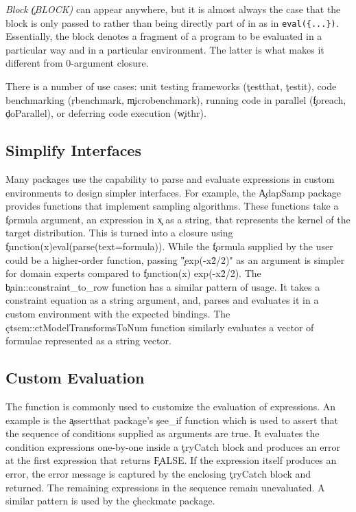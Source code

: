\documentclass[screen,acmsmall]{acmart}
\newcommand{\authorcomment}[3]{\xspace\textcolor{#1}{{\bf #2} #3}\xspace}
\newcommand{\todo}[1]{\authorcomment{red}{TODO}{#1}}
\begin{document}
\begin{compactitem}[---]
  \item \emph{Block \c{(BLOCK)}} can appear anywhere, but it is almost always
    the case that the block is only passed to \eval rather than being directly
    part of in as in \lstinline|eval({...})|. Essentially, the block denotes a
    fragment of a program to be evaluated in a particular way and in a particular
    environment. The latter is what makes it different from 0-argument closure.

    There is a number of use cases: unit testing frameworks (\eg \c{testthat},
    \c{testit}), code benchmarking (\eg \c{rbenchmark}, \c{microbenchmark}),
    running code in parallel (\eg \c{foreach}, \c{doParallel}), or deferring
    code execution (\eg \c{withr}).

\end{compactitem}


\subsection{Simplify Interfaces}
Many packages use the capability to parse and evaluate expressions in custom
environments to design simpler interfaces. For example, the \c{AdapSamp} package
provides functions that implement sampling algorithms. These functions take a
\c{formula} argument, an expression in \c{x} as a string, that represents the
kernel of the target distribution. This is turned into a closure using
\c{function(x){eval(parse(text=formula))}}. While the \c{formula} supplied by
the user could be a higher-order function, passing \c{"exp(-x\^2/2)"} as an
argument is simpler for domain experts compared to \c{function(x) exp(-x\^2/2)}.
The \c{bain::constraint\_to\_row} function has a similar pattern of \eval usage.
It takes a constraint equation as a string argument, and, parses and evaluates
it in a custom environment with the expected bindings. The
\c{ctsem::ctModelTransformsToNum} function similarly evaluates a vector of
formulae represented as a string vector.

\subsection{Custom Evaluation}
The \eval function is commonly used to customize the evaluation of expressions.
An example is the \c{assertthat} package's \c{see\_if} function which is used to
assert that the sequence of conditions supplied as arguments are true. It
evaluates the condition expressions one-by-one inside a \c{tryCatch} block and
produces an error at the first expression that returns \c{FALSE}. If the
expression itself produces an error, the error message is captured by the
enclosing \c{tryCatch} block and returned. The remaining expressions in the
sequence remain unevaluated. A similar pattern is used by the \c{checkmate}
package.
\end{document}
